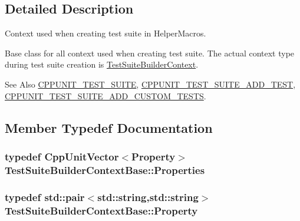 \subsection{Detailed Description}
Context used when creating test suite in Helper\-Macros. 

Base class for all context used when creating test suite. The actual context type during test suite creation is \hyperlink{class_test_suite_builder_context}{Test\-Suite\-Builder\-Context}.

\begin{DoxySeeAlso}{See Also}
\hyperlink{group___writing_test_fixture_gabe1e12200f40d6f25d60c1783c99da81}{C\-P\-P\-U\-N\-I\-T\-\_\-\-T\-E\-S\-T\-\_\-\-S\-U\-I\-T\-E}, \hyperlink{group___writing_test_fixture_gaace55a4a3a4f3e0cd219d38e98d4f48f}{C\-P\-P\-U\-N\-I\-T\-\_\-\-T\-E\-S\-T\-\_\-\-S\-U\-I\-T\-E\-\_\-\-A\-D\-D\-\_\-\-T\-E\-S\-T}, \hyperlink{group___writing_test_fixture_ga516fec19cd7a7acb6fbf194bd98c4c09}{C\-P\-P\-U\-N\-I\-T\-\_\-\-T\-E\-S\-T\-\_\-\-S\-U\-I\-T\-E\-\_\-\-A\-D\-D\-\_\-\-C\-U\-S\-T\-O\-M\-\_\-\-T\-E\-S\-T\-S}. 
\end{DoxySeeAlso}


\subsection{Member Typedef Documentation}
\hypertarget{class_test_suite_builder_context_base_a95565394a60a8b8d843a5a64d2572a86}{
\subsubsection[{Properties}]{\setlength{\rightskip}{0pt plus 5cm}typedef {\bf Cpp\-Unit\-Vector}$<${\bf Property}$>$ {\bf Test\-Suite\-Builder\-Context\-Base\-::\-Properties}\hspace{0.3cm}{\ttfamily [protected]}}}\label{class_test_suite_builder_context_base_a95565394a60a8b8d843a5a64d2572a86}
\hypertarget{class_test_suite_builder_context_base_a1e2319a53ecd7a718c87f4ea5c42d4c6}{
\subsubsection[{Property}]{\setlength{\rightskip}{0pt plus 5cm}typedef std\-::pair$<${\bf std\-::string},{\bf std\-::string}$>$ {\bf Test\-Suite\-Builder\-Context\-Base\-::\-Property}\hspace{0.3cm}{\ttfamily [protected]}}}\label{class_test_suite_builder_context_base_a1e2319a53ecd7a718c87f4ea5c42d4c6}


